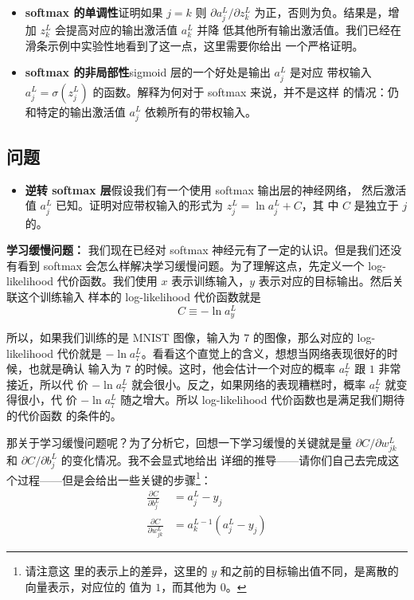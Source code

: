 \begin{itemize}
\item \textbf{softmax 的单调性}\quad 证明如果 $j=k$ 则 $\partial a_j^L/\partial
  z_k^L$ 为正，否则为负。结果是，增加 $z_k^L$ 会提高对应的输出激活值 $a_k^L$ 并降
  低其他所有输出激活值。我们已经在滑条示例中实验性地看到了这一点，这里需要你给出
  一个严格证明。
\item \textbf{softmax 的非局部性}\quad sigmoid 层的一个好处是输出 $a_j^L$ 是对应
  带权输入 $a_j^L = \sigma(z_j^L)$ 的函数。解释为何对于 softmax 来说，并不是这样
  的情况：仍和特定的输出激活值 $a_j^L$ 依赖所有的带权输入。
\end{itemize}

\subsection*{问题}

\begin{itemize}
\item \textbf{逆转 softmax 层}\quad 假设我们有一个使用 softmax 输出层的神经网络，
  然后激活值 $a_j^L$ 已知。证明对应带权输入的形式为 $z_j^L = \ln a_j^L + C$，其
  中 $C$ 是独立于 $j$ 的。
\end{itemize}

\textbf{学习缓慢问题：} 我们现在已经对 softmax 神经元有了一定的认识。但是我们还没
有看到 softmax 会怎么样解决学习缓慢问题。为了理解这点，先定义一个 log-likelihood
代价函数。我们使用 $x$ 表示训练输入，$y$ 表示对应的目标输出。然后关联这个训练输入
样本的 log-likelihood 代价函数就是
\begin{equation}
  C \equiv -\ln a^L_y
  \label{eq:80}\tag{80}
\end{equation}

所以，如果我们训练的是 MNIST 图像，输入为 $7$ 的图像，那么对应的 log-likelihood
代价就是 $-\ln a_7^L$。看看这个直觉上的含义，想想当网络表现很好的时候，也就是确认
输入为 $7$ 的时候。这时，他会估计一个对应的概率 $a_7^L$ 跟 $1$ 非常接近，所以代
价 $-\ln a_7^L$ 就会很小。反之，如果网络的表现糟糕时，概率 $a_7^L$ 就变得很小，代
价 $-\ln a_7^L$ 随之增大。所以 log-likelihood 代价函数也是满足我们期待的代价函数
的条件的。

那关于学习缓慢问题呢？为了分析它，回想一下学习缓慢的关键就是量 $\partial
C/\partial w_{jk}^L$ 和 $\partial C/\partial b_j^L$ 的变化情况。我不会显式地给出
详细的推导——请你们自己去完成这个过程——但是会给出一些关键的步骤\footnote{请注意这
  里的表示上的差异，这里的 $y$ 和之前的目标输出值不同，是离散的向量表示，对应位的
  值为 $1$，而其他为 $0$。}：
\begin{align}
  \frac{\partial C}{\partial b^L_j} &= a^L_j-y_j \label{eq:81}\tag{81}\\
  \frac{\partial C}{\partial w^L_{jk}} &= a^{L-1}_k (a^L_j-y_j) \label{eq:82}\tag{82}
\end{align}

